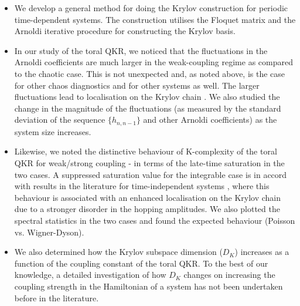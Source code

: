 \documentclass[a4paper,12pt]{article}
\begin{document}
\begin{itemize}
    \item 

We develop a general method for doing the Krylov construction for periodic time-dependent systems. The construction utilises the Floquet matrix and the Arnoldi iterative procedure for constructing the Krylov basis. 

\item
In our study of the toral QKR, we noticed that the fluctuations in the Arnoldi coefficients are much larger in the weak-coupling regime as compared to the chaotic case. This is not unexpected and, as noted above, is the case for other chaos diagnostics and for other systems as well. The larger fluctuations lead to localisation on the Krylov chain \cite{Rabinovici_2022, Dymarsky:2019elm}. We also studied the change in the magnitude of the fluctuations (as measured by the standard deviation of the sequence $\{ h_{n,n-1} \}$ and other Arnoldi coefficients) as the system size increases.  

\item
Likewise, we noted the distinctive behaviour of K-complexity of the toral QKR for weak/strong coupling - in terms of the late-time saturation in the two cases. A suppressed saturation value for the integrable case is in accord with results in the literature for time-independent systems \cite{Rabinovici_2021, Rabinovici_2022, integrability_to_chaos}, where this behaviour is associated with an enhanced localisation on the Krylov chain due to a stronger disorder in the hopping amplitudes. We also plotted the spectral statistics in the two cases and found the expected behaviour (Poisson vs. Wigner-Dyson).


\item 
We also determined how the Krylov subspace dimension ($D_K$) increases as a function of the coupling constant of the toral QKR. To the best of our knowledge, a detailed investigation of how $D_K$ changes on increasing the coupling strength in the Hamiltonian of a system has not been undertaken before in the literature.


\end{itemize}
\end{document}
